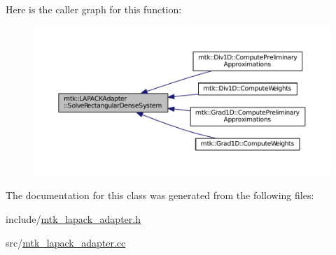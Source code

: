 Here is the caller graph for this function\+:\nopagebreak
\begin{figure}[H]
\begin{center}
\leavevmode
\includegraphics[width=350pt]{classmtk_1_1LAPACKAdapter_a380f148ffdf96bae2f79ae28f1a6560c_icgraph}
\end{center}
\end{figure}




The documentation for this class was generated from the following files\+:\begin{DoxyCompactItemize}
\item 
include/\hyperlink{mtk__lapack__adapter_8h}{mtk\+\_\+lapack\+\_\+adapter.\+h}\item 
src/\hyperlink{mtk__lapack__adapter_8cc}{mtk\+\_\+lapack\+\_\+adapter.\+cc}\end{DoxyCompactItemize}
